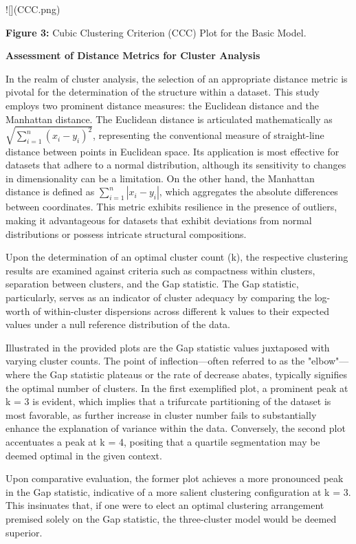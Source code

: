 \documentclass{sigkddExp}
\begin{document}
![](CCC.png)

\textbf{Figure 3:} Cubic Clustering Criterion (CCC) Plot for the Basic Model.


\textbf{Assessment of Distance Metrics for Cluster Analysis}

In the realm of cluster analysis, the selection of an appropriate distance metric is pivotal for the determination of the structure within a dataset. This study employs two prominent distance measures: the Euclidean distance and the Manhattan distance. The Euclidean distance is articulated mathematically as \( \sqrt{ \sum_{i=1}^{n} (x_i - y_i)^2 } \), representing the conventional measure of straight-line distance between points in Euclidean space. Its application is most effective for datasets that adhere to a normal distribution, although its sensitivity to changes in dimensionality can be a limitation. On the other hand, the Manhattan distance is defined as \( \sum_{i=1}^{n} |x_i - y_i| \), which aggregates the absolute differences between coordinates. This metric exhibits resilience in the presence of outliers, making it advantageous for datasets that exhibit deviations from normal distributions or possess intricate structural compositions.

Upon the determination of an optimal cluster count (k), the respective clustering results are examined against criteria such as compactness within clusters, separation between clusters, and the Gap statistic. The Gap statistic, particularly, serves as an indicator of cluster adequacy by comparing the log-worth of within-cluster dispersions across different k values to their expected values under a null reference distribution of the data.

Illustrated in the provided plots are the Gap statistic values juxtaposed with varying cluster counts. The point of inflection—often referred to as the "elbow"—where the Gap statistic plateaus or the rate of decrease abates, typically signifies the optimal number of clusters. In the first exemplified plot, a prominent peak at k = 3 is evident, which implies that a trifurcate partitioning of the dataset is most favorable, as further increase in cluster number fails to substantially enhance the explanation of variance within the data. Conversely, the second plot accentuates a peak at k = 4, positing that a quartile segmentation may be deemed optimal in the given context.

Upon comparative evaluation, the former plot achieves a more pronounced peak in the Gap statistic, indicative of a more salient clustering configuration at k = 3. This insinuates that, if one were to elect an optimal clustering arrangement premised solely on the Gap statistic, the three-cluster model would be deemed superior.
\end{document}
